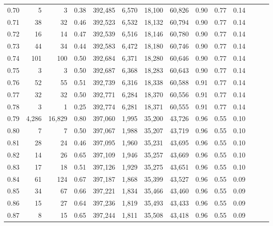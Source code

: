 \begin{tabular}{rrrrrrrrrrrrrr}
0.70 &       5 &       3 &  0.38 &  392,485 &    6,570 &  18,100 &  60,826 &  0.90 &  0.77 &      0.14 \\
0.71 &      38 &      32 &  0.46 &  392,523 &    6,532 &  18,132 &  60,794 &  0.90 &  0.77 &      0.14 \\
0.72 &      16 &      14 &  0.47 &  392,539 &    6,516 &  18,146 &  60,780 &  0.90 &  0.77 &      0.14 \\
0.73 &      44 &      34 &  0.44 &  392,583 &    6,472 &  18,180 &  60,746 &  0.90 &  0.77 &      0.14 \\
0.74 &     101 &     100 &  0.50 &  392,684 &    6,371 &  18,280 &  60,646 &  0.90 &  0.77 &      0.14 \\
0.75 &       3 &       3 &  0.50 &  392,687 &    6,368 &  18,283 &  60,643 &  0.90 &  0.77 &      0.14 \\
0.76 &      52 &      55 &  0.51 &  392,739 &    6,316 &  18,338 &  60,588 &  0.91 &  0.77 &      0.14 \\
0.77 &      32 &      32 &  0.50 &  392,771 &    6,284 &  18,370 &  60,556 &  0.91 &  0.77 &      0.14 \\
0.78 &       3 &       1 &  0.25 &  392,774 &    6,281 &  18,371 &  60,555 &  0.91 &  0.77 &      0.14 \\
0.79 &   4,286 &  16,829 &  0.80 &  397,060 &    1,995 &  35,200 &  43,726 &  0.96 &  0.55 &      0.10 \\
0.80 &       7 &       7 &  0.50 &  397,067 &    1,988 &  35,207 &  43,719 &  0.96 &  0.55 &      0.10 \\
0.81 &      28 &      24 &  0.46 &  397,095 &    1,960 &  35,231 &  43,695 &  0.96 &  0.55 &      0.10 \\
0.82 &      14 &      26 &  0.65 &  397,109 &    1,946 &  35,257 &  43,669 &  0.96 &  0.55 &      0.10 \\
0.83 &      17 &      18 &  0.51 &  397,126 &    1,929 &  35,275 &  43,651 &  0.96 &  0.55 &      0.10 \\
0.84 &      61 &     124 &  0.67 &  397,187 &    1,868 &  35,399 &  43,527 &  0.96 &  0.55 &      0.09 \\
0.85 &      34 &      67 &  0.66 &  397,221 &    1,834 &  35,466 &  43,460 &  0.96 &  0.55 &      0.09 \\
0.86 &      15 &      27 &  0.64 &  397,236 &    1,819 &  35,493 &  43,433 &  0.96 &  0.55 &      0.09 \\
0.87 &       8 &      15 &  0.65 &  397,244 &    1,811 &  35,508 &  43,418 &  0.96 &  0.55 &      0.09 \\

\end{tabular}
